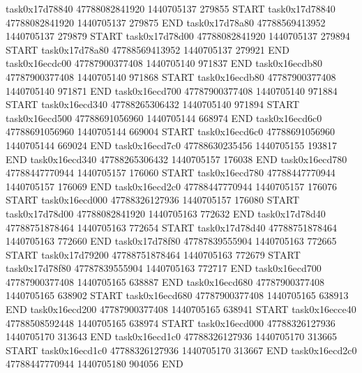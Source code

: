task0x17d78840 47788082841920          1440705137               279855  START
task0x17d78840 47788082841920          1440705137               279875  END
task0x17d78a80 47788569413952          1440705137               279879  START
task0x17d78d00 47788082841920          1440705137               279894  START
task0x17d78a80 47788569413952          1440705137               279921  END
task0x16ecdc00 47787900377408          1440705140               971837  END
task0x16ecdb80 47787900377408          1440705140               971868  START
task0x16ecdb80 47787900377408          1440705140               971871  END
task0x16ecd700 47787900377408          1440705140               971884  START
task0x16ecd340 47788265306432          1440705140               971894  START
task0x16ecd500 47788691056960          1440705144               668974  END
task0x16ecd6c0 47788691056960          1440705144               669004  START
task0x16ecd6c0 47788691056960          1440705144               669024  END
task0x16ecd7c0 47788630235456          1440705155               193817  END
task0x16ecd340 47788265306432          1440705157               176038  END
task0x16ecd780 47788447770944          1440705157               176060  START
task0x16ecd780 47788447770944          1440705157               176069  END
task0x16ecd2c0 47788447770944          1440705157               176076  START
task0x16ecd000 47788326127936          1440705157               176080  START
task0x17d78d00 47788082841920          1440705163               772632  END
task0x17d78d40 47788751878464          1440705163               772654  START
task0x17d78d40 47788751878464          1440705163               772660  END
task0x17d78f80 47787839555904          1440705163               772665  START
task0x17d79200 47788751878464          1440705163               772679  START
task0x17d78f80 47787839555904          1440705163               772717  END
task0x16ecd700 47787900377408          1440705165               638887  END
task0x16ecd680 47787900377408          1440705165               638902  START
task0x16ecd680 47787900377408          1440705165               638913  END
task0x16ecd200 47787900377408          1440705165               638941  START
task0x16ecce40 47788508592448          1440705165               638974  START
task0x16ecd000 47788326127936          1440705170               313643  END
task0x16ecd1c0 47788326127936          1440705170               313665  START
task0x16ecd1c0 47788326127936          1440705170               313667  END
task0x16ecd2c0 47788447770944          1440705180               904056  END
